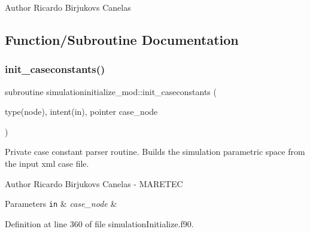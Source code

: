 \begin{DoxyAuthor}{Author}
Ricardo Birjukovs Canelas 
\end{DoxyAuthor}


\subsection{Function/\+Subroutine Documentation}
\mbox{\label{namespacesimulationinitialize__mod_ae41256ca5e72ebf27660ffdfe5c08e46}} 
\subsubsection{\texorpdfstring{init\+\_\+caseconstants()}{init\_caseconstants()}}
{\footnotesize\ttfamily subroutine simulationinitialize\+\_\+mod\+::init\+\_\+caseconstants (\begin{DoxyParamCaption}\item[{type(node), intent(in), pointer}]{case\+\_\+node }\end{DoxyParamCaption})\hspace{0.3cm}{\ttfamily [private]}}



Private case constant parser routine. Builds the simulation parametric space from the input xml case file. 

\begin{DoxyAuthor}{Author}
Ricardo Birjukovs Canelas -\/ M\+A\+R\+E\+T\+EC 
\end{DoxyAuthor}

\begin{DoxyParams}[1]{Parameters}
\mbox{\tt in}  & {\em case\+\_\+node} & \\
\hline
\end{DoxyParams}


Definition at line 360 of file simulation\+Initialize.\+f90.


